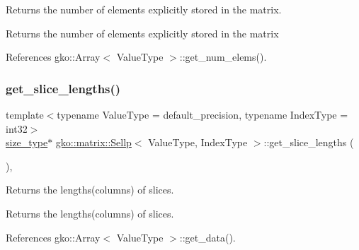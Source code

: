 Returns the number of elements explicitly stored in the matrix. 

\begin{DoxyReturn}{Returns}
the number of elements explicitly stored in the matrix 
\end{DoxyReturn}


References gko\+::\+Array$<$ Value\+Type $>$\+::get\+\_\+num\+\_\+elems().

\mbox{\label{classgko_1_1matrix_1_1Sellp_ab22f4de41d95db19e96433dc4583f512}} 
\subsubsection{\texorpdfstring{get\+\_\+slice\+\_\+lengths()}{get\_slice\_lengths()}}
{\footnotesize\ttfamily template$<$typename Value\+Type = default\+\_\+precision, typename Index\+Type = int32$>$ \\
\hyperlink{namespacegko_a6e5c95df0ae4e47aab2f604a22d98ee7}{size\+\_\+type}$\ast$ \hyperlink{classgko_1_1matrix_1_1Sellp}{gko\+::matrix\+::\+Sellp}$<$ Value\+Type, Index\+Type $>$\+::get\+\_\+slice\+\_\+lengths (\begin{DoxyParamCaption}{ }\end{DoxyParamCaption})\hspace{0.3cm}{\ttfamily [inline]}, {\ttfamily [noexcept]}}



Returns the lengths(columns) of slices. 

\begin{DoxyReturn}{Returns}
the lengths(columns) of slices. 
\end{DoxyReturn}


References gko\+::\+Array$<$ Value\+Type $>$\+::get\+\_\+data().

\mbox{\label{classgko_1_1matrix_1_1Sellp_afecef07cef594f1d23c735e66ee90ec6}} 
